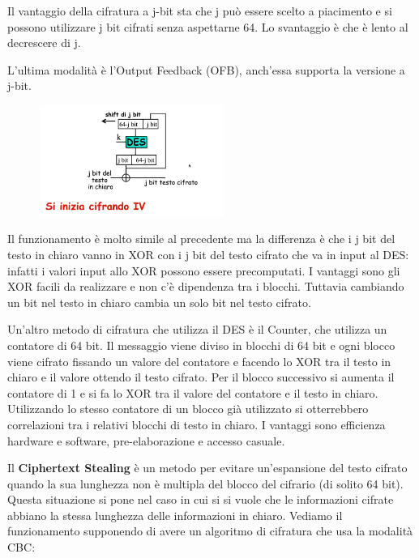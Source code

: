 Il vantaggio della cifratura a j-bit sta che j può essere scelto a piacimento e si possono utilizzare j bit cifrati senza aspettarne 64. Lo svantaggio è che è lento al decrescere di j.

L'ultima modalità è l'Output Feedback (OFB), anch'essa supporta la versione a j-bit.

\begin{figure}[htb!]
    \centering
    \includegraphics[width=6cm]{./Images/cap1/1.9.png}
\end{figure}

Il funzionamento è molto simile al precedente ma la differenza è che i j bit del testo in chiaro vanno in XOR con i j bit del testo cifrato che va in input al DES: infatti i valori input allo XOR possono essere precomputati. I vantaggi sono gli XOR facili da realizzare e non c'è dipendenza tra i blocchi. Tuttavia cambiando un bit nel testo in chiaro cambia un solo bit nel testo cifrato.

Un'altro metodo di cifratura che utilizza il DES è il Counter, che utilizza un contatore di 64 bit. Il messaggio viene diviso in blocchi di 64 bit e ogni blocco viene cifrato fissando un valore del contatore e facendo lo XOR tra il testo in chiaro e il valore ottendo il testo cifrato. Per il blocco successivo si aumenta il contatore di 1 e si fa lo XOR tra il valore del contatore e il testo in chiaro. Utilizzando lo stesso contatore di un blocco già utilizzato si otterrebbero correlazioni tra i relativi blocchi di testo in chiaro. I vantaggi sono efficienza hardware e software, pre-elaborazione e accesso casuale.

\vspace{5mm}

Il \textbf{Ciphertext Stealing} è un metodo per evitare un'espansione del testo cifrato quando la sua lunghezza non è multipla del blocco del cifrario (di solito 64 bit). Questa situazione si pone nel caso in cui si si vuole che le informazioni cifrate abbiano la stessa lunghezza delle informazioni in chiaro. Vediamo il funzionamento supponendo di avere un algoritmo di cifratura che usa la modalità CBC:

